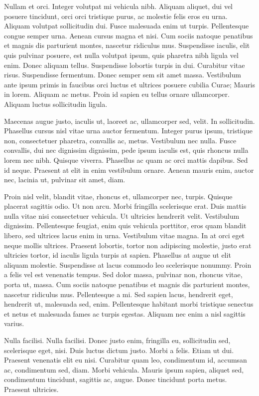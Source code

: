 Nullam et orci. Integer volutpat mi vehicula nibh. Aliquam aliquet,
dui vel posuere tincidunt, orci orci tristique purus, ac molestie
felis eros eu urna. Aliquam volutpat sollicitudin dui. Fusce malesuada
enim ut turpis. Pellentesque congue semper urna. Aenean cursus magna
et nisi. Cum sociis natoque penatibus et magnis dis parturient montes,
nascetur ridiculus mus. Suspendisse iaculis, elit quis pulvinar
posuere, est nulla volutpat ipsum, quis pharetra nibh ligula vel
enim. Donec aliquam tellus. Suspendisse lobortis turpis in
dui. Curabitur vitae risus. Suspendisse fermentum. Donec semper sem
sit amet massa. Vestibulum ante ipsum primis in faucibus orci luctus
et ultrices posuere cubilia Curae; Mauris in lorem. Aliquam ac
metus. Proin id sapien eu tellus ornare ullamcorper. Aliquam luctus
sollicitudin ligula.

Maecenas augue justo, iaculis ut, laoreet ac, ullamcorper sed,
velit. In sollicitudin. Phasellus cursus nisl vitae urna auctor
fermentum. Integer purus ipsum, tristique non, consectetuer pharetra,
convallis ac, metus. Vestibulum nec nulla. Fusce convallis, dui nec
dignissim dignissim, pede ipsum iaculis est, quis rhoncus nulla lorem
nec nibh. Quisque viverra. Phasellus ac quam ac orci mattis
dapibus. Sed id neque. Praesent at elit in enim vestibulum
ornare. Aenean mauris enim, auctor nec, lacinia ut, pulvinar sit amet,
diam.

Proin nisl velit, blandit vitae, rhoncus et, ullamcorper nec,
turpis. Quisque placerat sagittis odio. Ut non arcu. Morbi fringilla
scelerisque erat. Duis mattis nulla vitae nisi consectetuer
vehicula. Ut ultricies hendrerit velit. Vestibulum
dignissim. Pellentesque feugiat, enim quis vehicula porttitor, eros
quam blandit libero, sed ultrices lacus enim in urna. Vestibulum vitae
magna. In at orci eget neque mollis ultrices. Praesent lobortis,
tortor non adipiscing molestie, justo erat ultricies tortor, id
iaculis ligula turpis at sapien. Phasellus at augue ut elit aliquam
molestie. Suspendisse at lacus commodo leo scelerisque nonummy. Proin
a felis vel est venenatis tempus. Sed dolor massa, pulvinar non,
rhoncus vitae, porta ut, massa. Cum sociis natoque penatibus et magnis
dis parturient montes, nascetur ridiculus mus. Pellentesque a mi. Sed
sapien lacus, hendrerit eget, hendrerit ut, malesuada sed,
enim. Pellentesque habitant morbi tristique senectus et netus et
malesuada fames ac turpis egestas. Aliquam nec enim a nisl sagittis
varius.

Nulla facilisi. Nulla facilisi. Donec justo enim, fringilla eu,
sollicitudin sed, scelerisque eget, nisi. Duis luctus dictum
justo. Morbi a felis. Etiam ut dui. Praesent venenatis elit eu
nisi. Curabitur quam leo, condimentum id, accumsan ac, condimentum
sed, diam. Morbi vehicula. Mauris ipsum sapien, aliquet sed,
condimentum tincidunt, sagittis ac, augue. Donec tincidunt porta
metus. Praesent ultricies.

